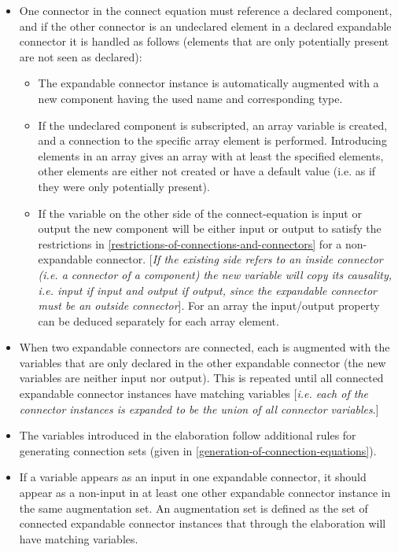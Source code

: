 \begin{itemize}
\item
  One connector in the connect equation must reference a declared
  component, and if the other connector is an undeclared element in a
  declared expandable connector it is handled as follows (elements that
  are only potentially present are not seen as declared):
\begin{itemize}
\item
  The expandable connector instance is automatically augmented with a
  new component having the used name and corresponding type.
\item
  If the undeclared component is subscripted, an array variable is
  created, and a connection to the specific array element is performed.
  Introducing elements in an array gives an array with at least the
  specified elements, other elements are either not created or have a
  default value (i.e. as if they were only potentially present).
\item
  If the variable on the other side of the connect-equation is input or
  output the new component will be either input or output to satisfy the
  restrictions in \autoref{restrictions-of-connections-and-connectors} for a non-expandable connector.
  {[}\emph{If the existing side refers to an inside connector (i.e. a
  connector of a component) the new variable will copy its causality,
  i.e. input if input and output if output, since the expandable
  connector must be an outside connector}{]}. For an array the
  input/output property can be deduced separately for each array
  element.
\end{itemize}
\item
  When two expandable connectors are connected, each is augmented with
  the variables that are only declared in the other expandable connector
  (the new variables are neither input nor output). This is repeated
  until all connected expandable connector instances have matching
  variables {[}\emph{i.e. each of the connector instances is expanded to
  be the union of all connector variables}.{]}
\item
  The variables introduced in the elaboration follow additional rules
  for generating connection sets (given in \autoref{generation-of-connection-equations}).
\item
  If a variable appears as an input in one expandable connector, it
  should appear as a non-input in at least one other expandable
  connector instance in the same augmentation set. An augmentation set
  is defined as the set of connected expandable connector instances that
  through the elaboration will have matching variables.


\end{itemize}
